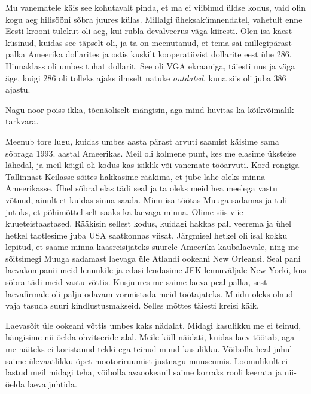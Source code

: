 
Mu vanematele käis see kohutavalt pinda, et ma ei viibinud üldse kodus, vaid olin
kogu aeg hilisööni sõbra juures külas. Millalgi üheksakümnendatel, 
vahetult enne Eesti krooni tulekut oli aeg, kui rubla devalveerus väga
kiiresti. Olen isa käest küsinud, kuidas see täpselt oli, ja ta on meenutanud, et 
tema sai millegipärast palka Ameerika dollarites ja ostis
kuskilt kooperatiivist dollarite eest
ühe 286. Hinnaklass oli umbes tuhat dollarit. See oli 
VGA ekraaniga, täiesti uus ja väga äge, kuigi 286 oli
tolleks ajaks ilmselt natuke \emph{outdated}, kuna siis oli juba 386 
ajastu.


Nagu noor poiss ikka, tõenäoliselt mängisin, aga mind huvitas ka kõikvõimalik 
tarkvara.

Meenub tore lugu, kuidas umbes aasta pärast arvuti saamist käisime sama sõbraga 1993. aastal Ameerikas. 
Meil oli kolmene punt, kes me 
elasime üksteise lähedal, ja meil kõigil oli kodus kas isiklik või vanemate 
tööarvuti. Kord rongiga Tallinnast Keilasse sõites
hakkasime rääkima, et jube lahe oleks minna 
Ameerikasse. Ühel sõbral elas tädi seal ja ta oleks meid hea meelega vastu võtnud, ainult et
kuidas sinna saada. Minu isa töötas Muuga 
sadamas ja tuli jutuks, et põhimõtteliselt saaks ka 
laevaga minna. Olime siis
viie-kuueteistaastased. Rääkisin sellest kodus, kuidagi hakkas 
pall veerema ja ühel hetkel taotlesime juba USA saatkonnas viisat. 
Järgmisel hetkel oli isal kokku lepitud, et saame minna kaasreisijateks 
suurele Ameerika kaubalaevale, ning me sõitsimegi Muuga sadamast laevaga üle Atlandi ookeani 
New Orleansi. Seal pani laevakompanii meid lennukile ja 
edasi lendasime JFK lennuväljale New Yorki, kus sõbra tädi meid vastu 
võttis. Kusjuures me saime laeva peal palka, sest laevafirmale oli palju odavam 
vormistada meid töötajateks. Muidu oleks olnud vaja tasuda suuri 
kindlustusmakseid. Selles mõttes täiesti kreisi käik.


Laevasõit üle ookeani võttis umbes kaks nädalat. Midagi kasulikku me ei teinud, hängisime nii-öelda ohvitseride
alal. Meile küll näidati, kuidas laev töötab, aga me näiteks ei koristanud tekki ega teinud muud kasulikku. 
Võibolla heal juhul saime ülevaatlikku õpet mootoriruumist justnagu muuseumis. Loomulikult ei lastud meil midagi teha, võibolla avaookeanil saime korraks rooli keerata ja nii-öelda
laeva juhtida.

